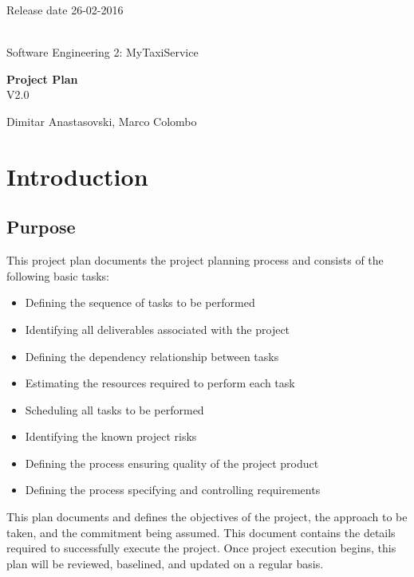\documentclass[12pt, oneside]{book}   	%
\begin{document}
\thispagestyle{empty}
\hspace{10cm}
Release date 26-02-2016
\\
\\
\begin{center}
{\huge Software Engineering 2:}
{\huge MyTaxiService}
\end{center}
\vspace*{\fill}
\begin{center}
\textbf{\huge Project Plan} 
\\
\large{V2.0}
\end{center}
\vfill
\begin{center}
{\large Dimitar Anastasovski, Marco Colombo}
\end{center}
\clearpage
\tableofcontents
\thispagestyle{empty}
\setcounter{page}{1}
\clearpage
\pagestyle{plain}
\chapter{Introduction}
\section{Purpose}
This project plan documents the project planning process and consists of the following basic tasks:
\begin{itemize}
\item Defining the sequence of tasks to be performed
\item Identifying all deliverables associated with the project
\item Defining the dependency relationship between tasks
\item Estimating the resources required to perform each task
\item Scheduling all tasks to be performed
\item Identifying the known project risks
\item Defining the process ensuring quality of the project product
\item Defining the process specifying and controlling requirements
\end{itemize}
This plan documents and defines the objectives of the project, the approach to be taken, and the commitment being assumed. This document contains the details required to successfully execute the project. Once project execution begins, this plan will be reviewed, baselined, and updated on a regular basis.
\end{document}
